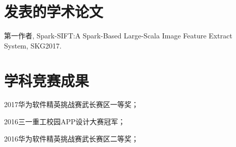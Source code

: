 ﻿\begin{resume}

  \section*{发表的学术论文} %

  \begin{enumerate}[{[}1{]}]
  \addtolength{\itemsep}{-.36\baselineskip}%
  \item 第一作者, Spark-SIFT:A Spark-Based Large-Scala Image Feature Extract System, SKG2017.
  \end{enumerate}

  \section*{学科竞赛成果} %
  \begin{enumerate}[{[}1{]}]
  \addtolength{\itemsep}{-.36\baselineskip}%
  \item 2017华为软件精英挑战赛武长赛区一等奖；
  \item 2016三一重工校园APP设计大赛冠军；
  \item 2016华为软件精英挑战赛武长赛区二等奖；
  \end{enumerate}
\end{resume}
